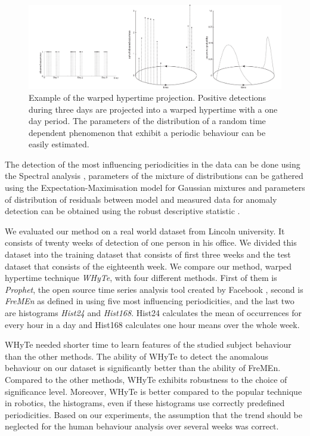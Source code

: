 \begin{figure}[h]
\begin{center}
    \includegraphics[width=1.0\columnwidth]{fig/hypertime_graph}
    \caption{Example of the warped hypertime projection. Positive detections during three days are projected into a warped hypertime with a one day period. The parameters of the distribution of a random time dependent phenomenon that exhibit a periodic behaviour can be easily estimated.\label{fig:hypertime}}

\end{center}
\end{figure}


The detection of the most influencing periodicities in the data can be done using the Spectral analysis \cite{brockwell2016introduction}, parameters of the mixture of distributions can be gathered using the Expectation-Maximisation model for Gaussian mixtures \cite{xu1996convergence} and parameters of distribution of residuals between model and measured data for anomaly detection can be obtained using the robust descriptive statistic \cite{maronna2006robust}. 

We evaluated our method on a real world dataset from Lincoln university. 
It consists of twenty weeks of detection of one person in his office.
We divided this dataset into the training dataset that consists of first three weeks
 and the test dataset that consists of the eighteenth week.%
We compare our method, warped hypertime technique \textit{WHyTe}, with four different methods.
First of them is \textit{Prophet}, the open source time series analysis tool created by Facebook \cite{taylor2018forecasting}, second is \textit{FreMEn} as defined in \cite{krajnik2017fremen} using five most influencing periodicities, and the last two are histograms \textit{Hist24} and \textit{Hist168}.
Hist24 calculates the mean of occurrences for every hour in a day and Hist168 calculates one hour means over the whole week.

WHyTe needed shorter time to learn features of the studied subject behaviour than the other methods.
The ability of WHyTe to detect the anomalous behaviour on our dataset is significantly better than the ability of FreMEn.
Compared to the other methods, WHyTe exhibits robustness to the choice of significance level.
Moreover, WHyTe is better compared to the popular technique in robotics, the histograms, even if these histograms use correctly predefined periodicities. 
Based on our experiments, the assumption that the trend should be neglected for the human behaviour analysis over several weeks was correct.

